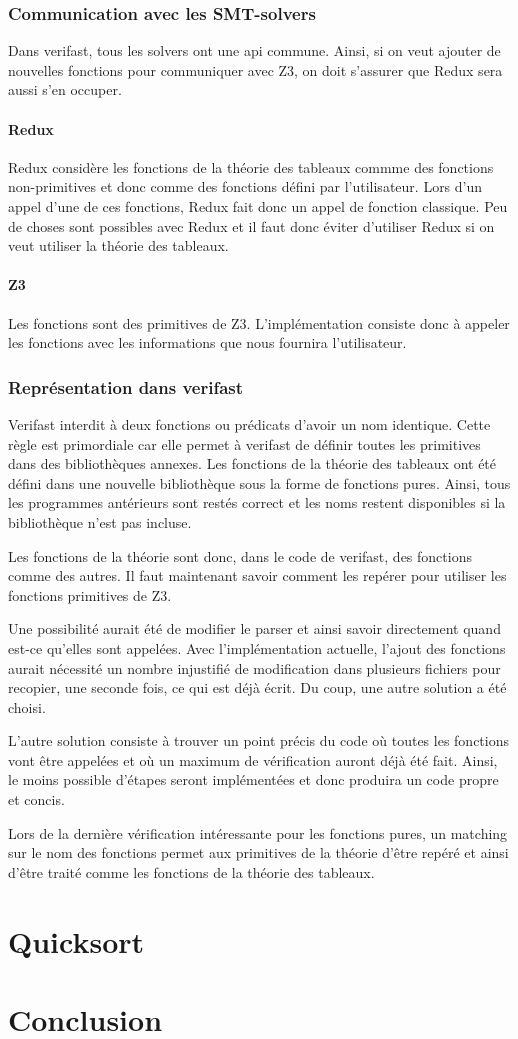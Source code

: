\documentclass[9pt]{book}
\begin{document}
		\subsection{Communication avec les SMT-solvers}
		Dans verifast, tous les solvers ont une api commune. Ainsi, si on veut ajouter de nouvelles fonctions pour communiquer avec Z3, on doit s'assurer que Redux sera aussi s'en occuper.
			\subsubsection{Redux}
			Redux consid\`ere les fonctions de la th\'eorie des tableaux commme des fonctions non-primitives et donc comme des fonctions d\'efini par l'utilisateur. Lors d'un appel d'une de ces fonctions, Redux fait donc un appel de fonction classique. Peu de choses sont possibles avec Redux et il faut donc \'eviter d'utiliser Redux si on veut utiliser la th\'eorie des tableaux.
			\subsubsection{Z3}
			Les fonctions sont des primitives de Z3. L'impl\'ementation consiste donc \`a appeler les fonctions avec les informations que nous fournira l'utilisateur.
		\subsection{Repr\'esentation dans verifast}
		Verifast interdit \`a deux fonctions ou pr\'edicats d'avoir un nom identique. Cette r\`egle est primordiale car elle permet \`a verifast de d\'efinir toutes les primitives dans des biblioth\`eques annexes. Les fonctions de la th\'eorie des tableaux ont \'et\'e d\'efini dans une nouvelle biblioth\`eque sous la forme de fonctions pures. Ainsi, tous les programmes ant\'erieurs sont rest\'es correct et les noms restent disponibles si la biblioth\`eque n'est pas incluse.\par
		Les fonctions de la th\'eorie sont donc, dans le code de verifast, des fonctions comme des autres. Il faut maintenant savoir comment les rep\'erer pour utiliser les fonctions primitives de Z3. \par
		Une possibilit\'e aurait \'et\'e de modifier le parser et ainsi savoir directement quand est-ce qu'elles sont appel\'ees. Avec l'impl\'ementation actuelle, l'ajout des fonctions aurait n\'ecessit\'e un nombre injustifi\'e de modification dans plusieurs fichiers pour recopier, une seconde fois, ce qui est d\'ej\`a \'ecrit. Du coup, une autre solution a \'et\'e choisi. \par
		L'autre solution consiste \`a trouver un point pr\'ecis du code o\`u toutes les fonctions vont \^etre appel\'ees et o\`u un maximum de v\'erification auront d\'ej\`a \'et\'e fait. Ainsi, le moins possible d'\'etapes seront impl\'ement\'ees et donc produira un code propre et concis.\par
		Lors de la derni\`ere v\'erification int\'eressante pour les fonctions pures, un matching sur le nom des fonctions permet aux primitives de la th\'eorie d'\^etre rep\'er\'e et ainsi d'\^etre trait\'e comme les fonctions de la th\'eorie des tableaux.
				
\chapter{Quicksort}
\chapter{Conclusion}
\tableofcontents
\end{document}
